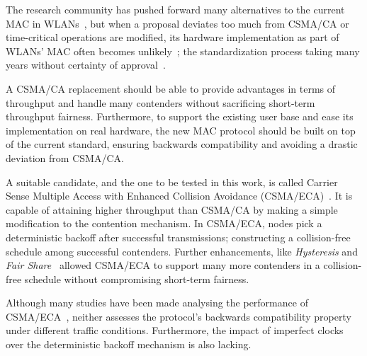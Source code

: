 \documentclass[a4paper,journal]{IEEEtran}
\begin{document}
The research community has pushed forward many alternatives to the current MAC in WLANs~\cite{bharghavan1994map,wang2004ncr,cali2000dti,lopez-toledo2006aoi,
barcelo2008lba,bellalta2009vtc,HE,CSMA_ECA,L_MAC2,hui2011epp,barcelo2011tcf}, but when a proposal deviates too much from CSMA/CA or time-critical operations are modified, its hardware implementation as part of WLANs' MAC often becomes unlikely~\cite{WMP}; the standardization process taking many years without certainty of approval~\cite{perahia2008ieee}. 


A CSMA/CA replacement should be able to provide advantages in terms of throughput and handle many contenders without sacrificing short-term throughput fairness. Furthermore, to support the existing user base and ease its implementation on real hardware, the new MAC protocol should be built on top of the current standard, ensuring backwards compatibility and avoiding a drastic deviation from CSMA/CA.


A suitable candidate, and the one to be tested in this work, is called Carrier Sense Multiple Access with Enhanced Collision Avoidance (CSMA/ECA)~\cite{barcelo2008lba}. It is capable of attaining higher throughput than CSMA/CA by making a simple modification to the contention mechanism. In CSMA/ECA, nodes pick a deterministic backoff after successful transmissions; constructing a collision-free schedule among successful contenders. Further enhancements, like \emph{Hysteresis} and \emph{Fair Share}~\cite{research2standards} allowed CSMA/ECA to support many more contenders in a collision-free schedule without compromising short-term fairness.

Although many studies have been made analysing the performance of CSMA/ECA~\cite{barcelo2008lba,research2standards,bellalta2009vtc,E2CA_performance}, neither assesses the protocol's backwards compatibility property under different traffic conditions. Furthermore, the impact of imperfect clocks over the deterministic backoff mechanism is also lacking.

\end{document}
